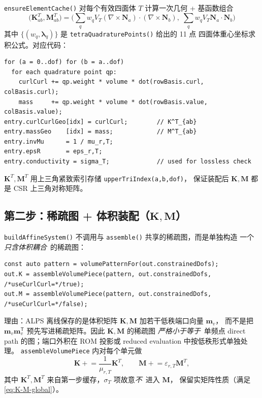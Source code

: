 \documentclass[UTF8,a4paper,11pt]{ctexart}
\newcommand{\transpose}{\mathsf{T}}
\newcommand{\Ne}{\bm{N}}
\newcommand{\code}[1]{\texttt{\small #1}}
\begin{document}
\code{ensureElementCache()} 对每个有效四面体 $T$ 计算一次几何 + 基函数组合
\begin{equation}
    \bigl(\bm K^T_{ab},\bm M^T_{ab}\bigr)
    =\biggl(\sum_q w_q V_T(\nabla\!\times\!\Ne_a)\!\cdot\!(\nabla\!\times\!\Ne_b),\;
    \sum_q w_q V_T \Ne_a\!\cdot\!\Ne_b\biggr)
\end{equation}
其中 $\{(w_q,\bm\lambda_q)\}$ 是 \code{tetraQuadraturePoints()} 给出的 11 点
四面体重心坐标求积公式。对应代码：
\begin{lstlisting}
for (a = 0..dof) for (b = a..dof)
  for each quadrature point qp:
    curlCurl += qp.weight * volume * dot(rowBasis.curl, colBasis.curl);
    mass     += qp.weight * volume * dot(rowBasis.value, colBasis.value);
entry.curlCurlGeo[idx] = curlCurl;        // K^T_{ab}
entry.massGeo    [idx] = mass;            // M^T_{ab}
entry.invMu      = 1 / mu_r,T;
entry.epsR       = eps_r,T;
entry.conductivity = sigma_T;             // used for lossless check
\end{lstlisting}
$\bm K^T,\bm M^T$ 用上三角紧致索引存储 \code{upperTriIndex(a,b,dof)}，
保证装配后 $\bm K,\bm M$ 都是 CSR 上三角对称矩阵。

\subsection{\texorpdfstring{第二步：稀疏图 + 体积装配（$\bm K,\bm M$）}{第二步：稀疏图 + 体积装配（K, M）}}
\label{sec:step-vol}

\code{buildAffineSystem()} 不调用与 \code{assemble()} 共享的稀疏图，而是单独构造
一个\emph{只含体积耦合}\ 的稀疏图：
\begin{lstlisting}
const auto pattern = volumePatternFor(out.constrainedDofs);
out.K = assembleVolumePiece(pattern, out.constrainedDofs, /*useCurlCurl=*/true);
out.M = assembleVolumePiece(pattern, out.constrainedDofs, /*useCurlCurl=*/false);
\end{lstlisting}
理由：ALPS 离线保存的是体积矩阵 $\bm K,\bm M$ 加若干低秩端口向量 $\bm m_v$，
而不是把 $\bm m_v\bm m_v^{\transpose}$ 预先写进稀疏矩阵。因此 $\bm K,\bm M$ 的稀疏图
\emph{严格小于等于}\ 单频点 direct path 的图；端口外积在 ROM 投影或 reduced evaluation 中按低秩形式单独处理。
\code{assembleVolumePiece} 内对每个单元做
\begin{equation}
    \bm K\mathrel{+}=\frac{1}{\mu_{r,T}}\bm K^T,\qquad
    \bm M\mathrel{+}=\varepsilon_{r,T}\bm M^T,
\end{equation}
其中 $\bm K^T,\bm M^T$ 来自第一步缓存，$\sigma_T$ 项故意\emph{不}\ 进入 $\bm M$，
保留实矩阵性质（满足 \eqref{eq:K-M-global}）。
\end{document}
